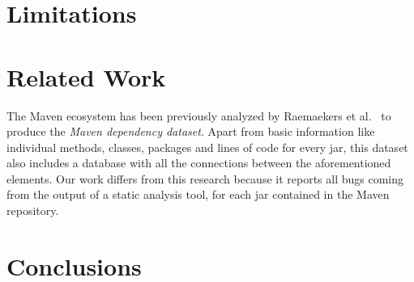 \documentclass{sig-alternate}
\begin{document}
\section{Limitations}
\label{sec:limit}


\section{Related Work}
\label{sec:rel}

The Maven ecosystem has been previously analyzed by Raemaekers et al.~\cite{RDV13} to produce the {\it Maven dependency dataset}. Apart from basic information like individual methods, classes, packages and lines of code for every {\sc jar}, this dataset also includes a database with all the connections between the aforementioned elements. Our work differs from this research because it reports all bugs coming from the output of a static analysis tool, for each {\sc jar} contained in the Maven repository.

\cite{MKLGS14} \cite{KARA14}

\section{Conclusions}
\label{sec:conc}




\end{document}
